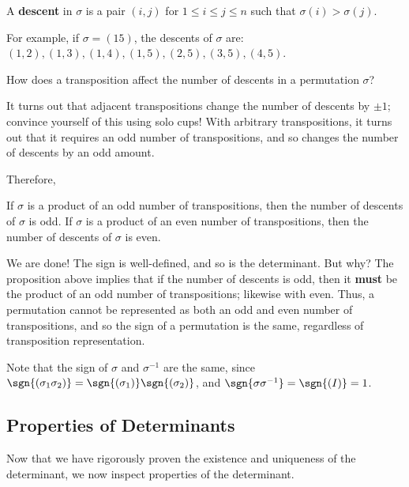 \documentclass[math0540-lecture-notes.tex]{subfiles}
\begin{document}
\begin{definition}[Descent]{}
  A \textbf{descent} in $\sigma$ is a pair $(i,j)$ for $1\le i\le j\le n$ such that
  $\sigma(i)>\sigma(j)$.
\end{definition}
For example, if $\sigma=(15)$, the descents of $\sigma$ are: $(1,2),(1,3),(1,4), (1,5), (2,5),
(3,5), (4,5)$. \begin{center}
How does a transposition affect the number of descents in a permutation $\sigma$?
\end{center}
It turns out that adjacent transpositions change the number of descents by $\pm 1$; convince
yourself of this using solo cups! With arbitrary transpositions, it turns out that it requires an
odd number of transpositions, and so changes the number of descents by an odd amount.

Therefore, 
\begin{proposition}{}
  If $\sigma$ is a product of an odd number of transpositions, then the number of descents of
  $\sigma$ is odd. If $\sigma$ is a product of an even number of transpositions, then the number of
  descents of $\sigma$ is even.
\end{proposition}

We are done! The sign is well-defined, and so is the determinant. But why? The proposition above
implies that if the number of descents is odd, then it \textbf{must} be the product of an odd number
of transpositions; likewise with even. Thus, a permutation cannot be represented as both an odd and
even number of transpositions, and so the sign of a permutation is the same, regardless of
transposition representation.

\begin{remark}
  Note that the sign of $\sigma$ and $\sigma^{-1}$ are the same, since
  $\sgn{(\sigma_1\sigma_2)}=\sgn{(\sigma_1)}\sgn{(\sigma_2)}$, and
  $\sgn{\sigma\sigma^{-1}}=\sgn{(I)}=1$.
\end{remark}


\subsection{Properties of Determinants}

Now that we have rigorously proven the existence and uniqueness of the determinant, we now inspect
properties of the determinant.
\end{document}
